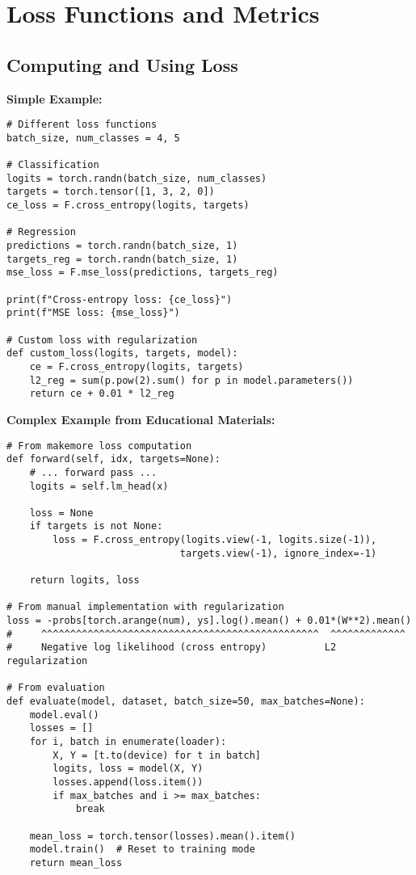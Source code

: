 \documentclass[11pt,a4paper]{book}
\begin{document}
\section{Loss Functions and Metrics}

\subsection{Computing and Using Loss}

\textbf{Simple Example:}
\begin{verbatim}
# Different loss functions
batch_size, num_classes = 4, 5

# Classification
logits = torch.randn(batch_size, num_classes)
targets = torch.tensor([1, 3, 2, 0])
ce_loss = F.cross_entropy(logits, targets)

# Regression
predictions = torch.randn(batch_size, 1)
targets_reg = torch.randn(batch_size, 1)
mse_loss = F.mse_loss(predictions, targets_reg)

print(f"Cross-entropy loss: {ce_loss}")
print(f"MSE loss: {mse_loss}")

# Custom loss with regularization
def custom_loss(logits, targets, model):
    ce = F.cross_entropy(logits, targets)
    l2_reg = sum(p.pow(2).sum() for p in model.parameters())
    return ce + 0.01 * l2_reg
\end{verbatim}

\textbf{Complex Example from Educational Materials:}
\begin{verbatim}
# From makemore loss computation
def forward(self, idx, targets=None):
    # ... forward pass ...
    logits = self.lm_head(x)
    
    loss = None
    if targets is not None:
        loss = F.cross_entropy(logits.view(-1, logits.size(-1)), 
                              targets.view(-1), ignore_index=-1)
    
    return logits, loss

# From manual implementation with regularization
loss = -probs[torch.arange(num), ys].log().mean() + 0.01*(W**2).mean()
#     ^^^^^^^^^^^^^^^^^^^^^^^^^^^^^^^^^^^^^^^^^^^^^^^^  ^^^^^^^^^^^^^
#     Negative log likelihood (cross entropy)          L2 regularization

# From evaluation
def evaluate(model, dataset, batch_size=50, max_batches=None):
    model.eval()
    losses = []
    for i, batch in enumerate(loader):
        X, Y = [t.to(device) for t in batch]
        logits, loss = model(X, Y)
        losses.append(loss.item())
        if max_batches and i >= max_batches:
            break
    
    mean_loss = torch.tensor(losses).mean().item()
    model.train()  # Reset to training mode
    return mean_loss
\end{verbatim}
\end{document}
